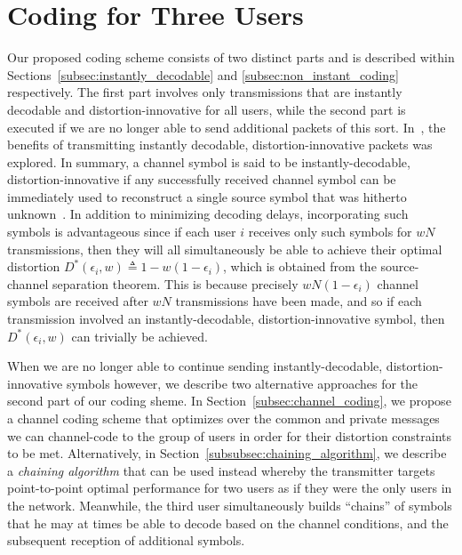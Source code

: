 \section{Coding for Three Users}
\label{sec:three_users}

Our proposed coding scheme consists of two distinct parts and is described within Sections~\ref{subsec:instantly_decodable} and \ref{subsec:non_instant_coding} respectively. The first part involves only transmissions that are instantly decodable and distortion-innovative for all users, while the second part is executed if we are no longer able to send additional packets of this sort.  In~\cite{TMKS_TIT20}, the benefits of transmitting instantly decodable, distortion-innovative packets was explored.  In summary, a channel symbol is said to be instantly-decodable, distortion-innovative if any successfully received channel symbol can be immediately used to reconstruct a single source symbol that was hitherto unknown~\cite{TMKS_TIT20}.  In addition to minimizing decoding delays, incorporating such symbols is advantageous since if each user $i$ receives only such symbols for $wN$ transmissions, then they will all simultaneously be able to achieve their optimal distortion $D^{*}(\epsilon_i, w) \triangleq 1 - w(1 - \epsilon_i)$, which is obtained from the source-channel separation theorem.  This is because precisely $wN(1 - \epsilon_i)$ channel symbols are received after $wN$ transmissions have been made, and so if each transmission involved an instantly-decodable, distortion-innovative symbol, then $D^{*}(\epsilon_i, w)$ can trivially be achieved.


When we are no longer able to continue sending instantly-decodable, distortion-innovative symbols however, we describe two alternative approaches for the second part of our coding sheme.  In Section~\ref{subsec:channel_coding}, we propose a channel coding scheme that optimizes over the common and private messages we can channel-code to the group of users in order for their distortion constraints to be met.  Alternatively, in Section~\ref{subsubsec:chaining_algorithm}, we describe a \emph{chaining algorithm} that can be used instead whereby the transmitter targets point-to-point optimal performance for two users as if they were the only users in the network. Meanwhile, the third user simultaneously builds ``chains'' of symbols that he may at times be able to decode based on the channel conditions, and the subsequent reception of additional symbols.  



